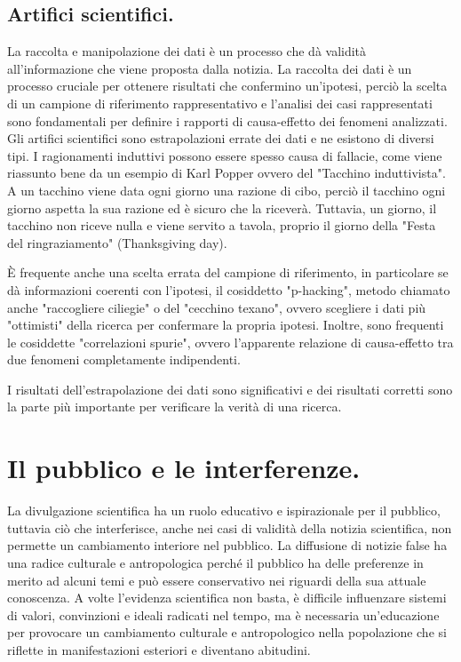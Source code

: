 \documentclass[a4paper]{article}
\begin{document}
\subsection{Artifici scientifici.}
La raccolta e manipolazione dei dati è un processo che dà validità all'informazione che viene proposta dalla notizia.
La raccolta dei dati è un processo cruciale per ottenere risultati che confermino un'ipotesi, perciò la scelta di un campione di riferimento rappresentativo e l'analisi dei casi rappresentati sono fondamentali per definire i rapporti di causa-effetto dei fenomeni analizzati. \\
Gli artifici scientifici sono estrapolazioni errate dei dati e ne esistono di diversi tipi.
I ragionamenti induttivi possono essere spesso causa di fallacie, come viene riassunto bene da un esempio di Karl Popper ovvero del "Tacchino induttivista". A un tacchino viene data ogni giorno una razione di cibo, perciò il tacchino ogni giorno aspetta la sua razione ed è sicuro che la riceverà. Tuttavia, un giorno, il tacchino non riceve nulla e viene servito a tavola, proprio il giorno della "Festa del ringraziamento" (Thanksgiving day).

È frequente anche una scelta errata del campione di riferimento, in particolare se dà informazioni coerenti con l'ipotesi, il cosiddetto "p-hacking", metodo chiamato anche "raccogliere ciliegie" o del "cecchino texano", ovvero scegliere i dati più "ottimisti" della ricerca per confermare la propria ipotesi.
Inoltre, sono frequenti le cosiddette "correlazioni spurie", ovvero l'apparente relazione di causa-effetto tra due fenomeni completamente indipendenti.

I risultati dell'estrapolazione dei dati sono significativi e dei risultati corretti sono
la parte più importante per verificare la verità di una ricerca.

\section{Il pubblico e le interferenze.}
La divulgazione scientifica ha un ruolo educativo e ispirazionale per il pubblico, tuttavia ciò che interferisce, anche nei casi di validità della notizia scientifica, non permette un cambiamento interiore nel pubblico.
La diffusione di notizie false ha una radice culturale e antropologica perché il pubblico ha delle preferenze in merito ad alcuni temi e può essere conservativo nei riguardi della sua attuale conoscenza.
A volte l'evidenza scientifica non basta, è difficile influenzare sistemi di valori, convinzioni e ideali radicati nel tempo, ma è necessaria un'educazione per provocare un cambiamento culturale e antropologico nella popolazione che si riflette in manifestazioni esteriori e diventano abitudini.
\end{document}
